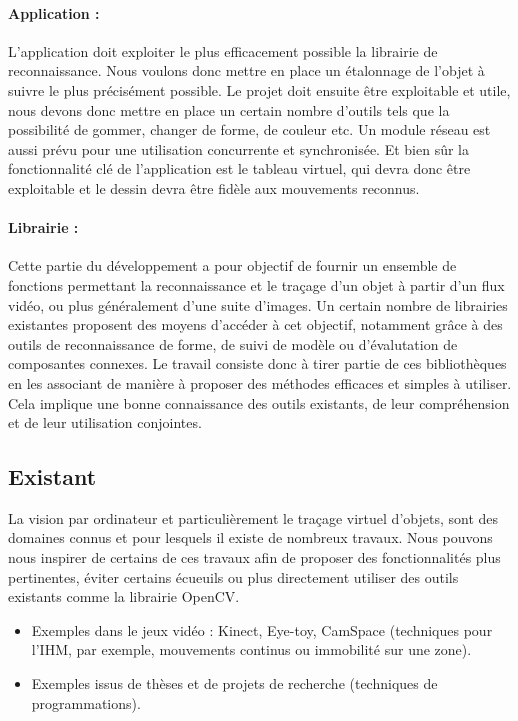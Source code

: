\documentclass{article}
\begin{document}
			\paragraph{Application :\\}
L'application doit exploiter le plus efficacement possible la librairie de reconnaissance. Nous voulons donc mettre en place un étalonnage de l'objet à suivre le plus précisément possible. Le projet doit ensuite être exploitable et utile, nous devons donc mettre en place un certain nombre d'outils tels que la possibilité de gommer, changer de forme, de couleur etc. 
Un module réseau est aussi prévu pour une utilisation concurrente et synchronisée. Et bien sûr la fonctionnalité clé de l'application est le tableau virtuel, qui devra donc être exploitable et le dessin devra être fidèle aux mouvements reconnus.
			\paragraph{Librairie :\\}
				Cette partie du développement a pour objectif de fournir un ensemble de fonctions permettant la reconnaissance et le traçage d'un objet à partir d'un flux vidéo, ou plus généralement d'une suite d'images. Un certain nombre de librairies existantes proposent des moyens d'accéder à cet objectif, notamment grâce à des outils de reconnaissance de forme, de suivi de modèle ou d'évalutation de composantes connexes. Le travail consiste donc à tirer partie de ces bibliothèques en les associant de manière à proposer des méthodes efficaces et simples à utiliser. Cela implique une bonne connaissance des outils existants, de leur compréhension et de leur utilisation conjointes.
		\subsection{Existant}
		La vision par ordinateur et particulièrement le traçage virtuel d'objets, sont des domaines connus et pour lesquels il existe de nombreux travaux. Nous pouvons nous inspirer de certains de ces travaux afin de proposer des fonctionnalités plus pertinentes, éviter certains écueuils ou plus directement utiliser des outils existants comme la librairie OpenCV.\\
			\begin{itemize}
				\item Exemples dans le jeux vidéo : Kinect, Eye-toy, CamSpace (techniques pour l'IHM, par exemple, mouvements continus ou immobilité sur une zone).
				\item Exemples issus de thèses et de projets de recherche (techniques de programmations).
			\end{itemize}
\end{document}
